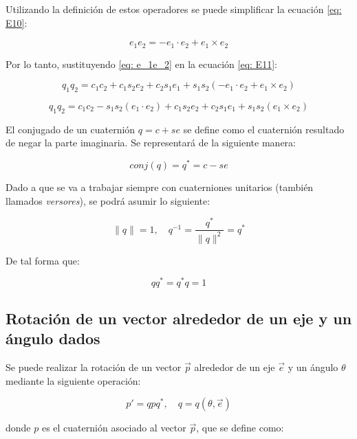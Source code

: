 \documentclass[10pt, a4paper]{report}
\begin{document}
Utilizando la definición de estos operadores se puede simplificar la ecuación \eqref{eq: E10}:

\begin{equation} \label{eq: e_1e_2}
e_1 e_2 =  -e_1 \cdot e_2 + e_1 \times e_2
\end{equation}

Por lo tanto, sustituyendo \eqref{eq: e_1e_2} en la ecuación \eqref{eq: E11}:

$$ q_1 q_2 = c_1 c_2 + c_1 s_2 e_2 + c_2 s_1 e_1 + s_1 s_2 (-e_1 \cdot e_2 + e_1 \times e_2) $$

\begin{equation}
q_1 q_2 = c_1 c_2 - s_1 s_2 (e_1 \cdot e_2) + c_1 s_2 e_2 + c_2 s_1 e_1 + s_1 s_2 (e_1 \times e_2)
\end{equation}

El conjugado de un cuaternión $ q = c + s e $ se define como el cuaternión resultado de negar la parte imaginaria. Se representará de la siguiente manera:

\begin{equation}
conj(q) = q^* = c - s e
\end{equation}

Dado a que se va a trabajar siempre con cuaterniones unitarios (también llamados \textit{versores}), se podrá asumir lo siguiente:

\begin{equation}
\|q\| = 1 , \quad q^{-1} = \frac{q^*}{\|q\|^2} = q^*
\end{equation}

De tal forma que:

\begin{equation} \label{eq: qq*}
qq^* = q^*q = 1
\end{equation}

\subsection{Rotación de un vector alrededor de un eje y un ángulo dados}

Se puede realizar la rotación de un vector $\vec{p}$ alrededor de un eje $\vec{e}$ y un ángulo $\theta$ mediante la siguiente operación:

\begin{equation}
p' = qpq^*, \quad q = q(\theta, \vec{e})
\end{equation}

donde $p$ es el cuaternión asociado al vector $\vec{p}$, que se define como:
\end{document}
